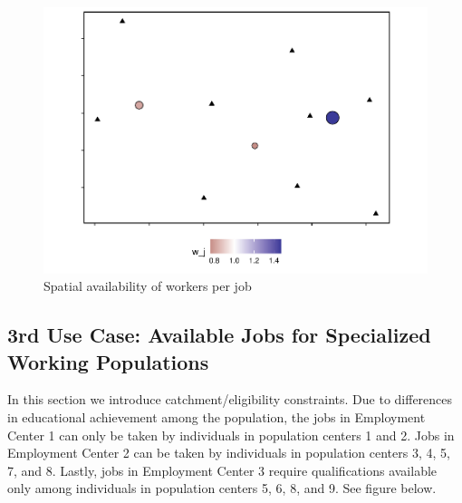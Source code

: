 \documentclass[]{elsarticle} %
\begin{document}
\begin{figure}
\includegraphics[width=1\linewidth]{Spatial-Availability_files/figure-latex/toy-example-availability-workers-per-job-1} \caption{\label{fig:toy-example-availability-workers-per-job}Spatial availability of workers per job}\label{fig:toy-example-availability-workers-per-job}
\end{figure}

\hypertarget{rd-use-case-available-jobs-for-specialized-working-populations}{%
\subsection{3rd Use Case: Available Jobs for Specialized Working
Populations}\label{rd-use-case-available-jobs-for-specialized-working-populations}}

In this section we introduce catchment/eligibility constraints. Due to
differences in educational achievement among the population, the jobs in
Employment Center 1 can only be taken by individuals in population
centers 1 and 2. Jobs in Employment Center 2 can be taken by individuals
in population centers 3, 4, 5, 7, and 8. Lastly, jobs in Employment
Center 3 require qualifications available only among individuals in
population centers 5, 6, 8, and 9. See figure below.
\end{document}
